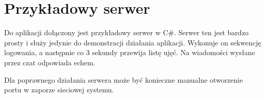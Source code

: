 \documentclass[11pt, letterpaper]{article}
\begin{document}
\section{Przykładowy serwer}
Do aplikacji dołączony jest przykładowy serwer w C\#. Serwer ten jest bardzo prosty i służy jedynie do demonstracji działania aplikacji. Wykonuje on sekwencję logowania, a następnie co 3 sekundy przewija listę ujęć. Na wiadomości wysłane przez czat odpowiada echem.

Dla poprawnego działania serwera może być konieczne manualne otworzenie portu w zaporze sieciowej systemu.
\end{document}
